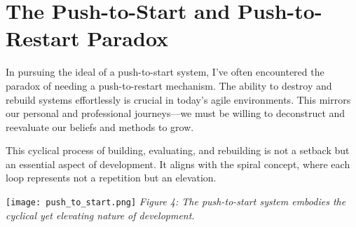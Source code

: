 \documentclass[../../main.tex]{subfiles}
\begin{document}
    \section{The Push-to-Start and Push-to-Restart Paradox}

    In pursuing the ideal of a push-to-start system, I've often encountered the paradox of needing a push-to-restart mechanism. The ability to destroy and rebuild systems effortlessly is crucial in today's agile environments. This mirrors our personal and professional journeys—we must be willing to deconstruct and reevaluate our beliefs and methods to grow.

    This cyclical process of building, evaluating, and rebuilding is not a setback but an essential aspect of development. It aligns with the spiral concept, where each loop represents not a repetition but an elevation.

    \vspace{0.5cm}
    \noindent\texttt{[image: push\_to\_start.png]}
    \newline
    \textit{Figure 4: The push-to-start system embodies the cyclical yet elevating nature of development.}
    \vspace{0.5cm}
\end{document}
